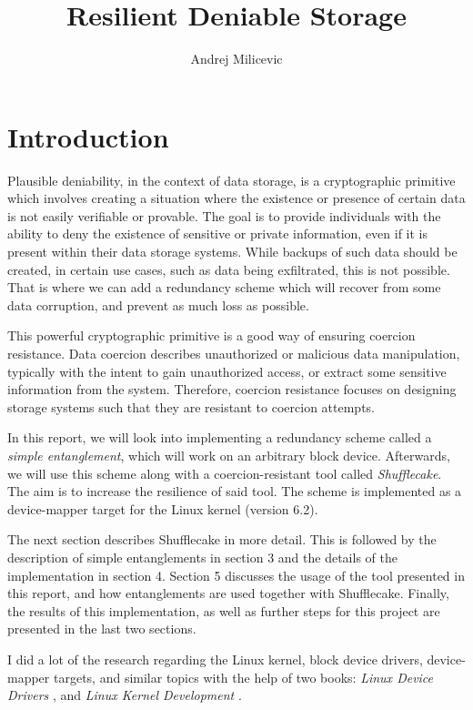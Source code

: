 \documentclass[a4paper,11pt,oneside]{report}
\title{Resilient Deniable Storage}
\author{Andrej Milicevic}
\begin{document}
\maketitle
\makeacks

\maketoc

\chapter{Introduction}

Plausible deniability, in the context of data storage, is a cryptographic primitive which involves creating a situation where the existence or presence of certain data is not easily verifiable or provable. The goal is to provide individuals with the ability to deny the existence of sensitive or private information, even if it is present within their data storage systems. While backups of such data should be created, in certain use cases, such as data being exfiltrated, this is not possible. That is where we can add a redundancy scheme which will recover from some data corruption, and prevent as much loss as possible. 

This powerful cryptographic primitive is a good way of ensuring coercion resistance. Data coercion describes unauthorized or malicious data manipulation, typically with the intent to gain unauthorized access, or extract some sensitive information from the system. Therefore, coercion resistance focuses on designing storage systems such that they are resistant to coercion attempts. 

In this report, we will look into implementing a redundancy scheme called a \emph{simple entanglement}, which will work on an arbitrary block device. Afterwards, we will use this scheme along with a coercion-resistant tool called \emph{Shufflecake}. The aim is to increase the resilience of said tool. The scheme is implemented as a device-mapper target for the Linux kernel (version 6.2). 

The next section describes Shufflecake in more detail. This is followed by the description of simple entanglements in section 3 and the details of the implementation in section 4. Section 5 discusses the usage of the tool presented in this report, and how entanglements are used together with Shufflecake. Finally, the results of this implementation, as well as further steps for this project are presented in the last two sections. 

I did a lot of the research regarding the Linux kernel, block device drivers, device-mapper targets, and similar topics with the help of two books: \emph{Linux Device Drivers} \cite{ldd3}, and \emph{Linux Kernel Development} \cite{love2010linux}. 
\end{document}
